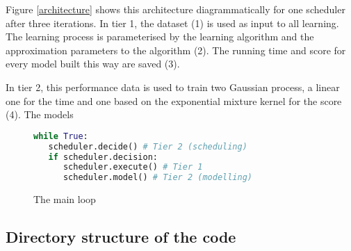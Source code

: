 \documentclass[a4paper,12pt,twoside,openright]{report}
\begin{document}
Figure \ref{architecture} shows this architecture diagrammatically for one scheduler after three iterations. In tier 1, the dataset (1) is used as input to all learning. The learning process is parameterised by the learning algorithm and the approximation parameters to the algorithm (2). The running time and score for every model built this way are saved (3). 

In tier 2, this performance data is used to train two Gaussian process, a linear one for the time and one based on the exponential mixture kernel for the score (4). The models 




\begin{figure}[ht]
\begin{lstlisting}[language=Python]
while True:
   scheduler.decide() # Tier 2 (scheduling)
   if scheduler.decision:
      scheduler.execute() # Tier 1
      scheduler.model() # Tier 2 (modelling)
\end{lstlisting}
\caption{The main loop}
\label{mainloop}
\end{figure}


\subsection{Directory structure of the code}
\end{document}
